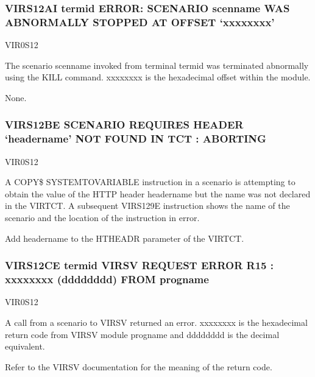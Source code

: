 \documentclass[letterpaper,10pt,english]{sphinxmanual}
\begin{document}
\subsubsection{VIRS12AI termid ERROR: SCENARIO scenname WAS ABNORMALLY STOPPED AT OFFSET ‘xxxxxxxx’}
\label{\detokenize{messages:virs12ai-termid-error-scenario-scenname-was-abnormally-stopped-at-offset-xxxxxxxx}}\begin{description}
\sphinxAtStartPar
VIR0S12

\sphinxAtStartPar
The scenario scenname invoked from terminal termid was terminated abnormally using the KILL command. xxxxxxxx is the hexadecimal offset within the module.

\sphinxAtStartPar
None.

\end{description}


\subsubsection{VIRS12BE SCENARIO REQUIRES HEADER ‘headername’ NOT FOUND IN TCT : ABORTING}
\label{\detokenize{messages:virs12be-scenario-requires-header-headername-not-found-in-tct-aborting}}\begin{description}
\sphinxAtStartPar
VIR0S12

\sphinxAtStartPar
A COPY\$ SYSTEM\sphinxhyphen{}TO\sphinxhyphen{}VARIABLE instruction in a scenario is attempting to obtain the value of the HTTP header headername but the name was not declared in the VIRTCT. A subsequent VIRS129E instruction shows the name of the scenario and the location of the instruction in error.

\sphinxAtStartPar
Add headername to the HTHEADR parameter of the VIRTCT.

\end{description}


\subsubsection{VIRS12CE termid VIRSV REQUEST ERROR \textendash{} R15 : xxxxxxxx (dddddddd) FROM progname}
\label{\detokenize{messages:virs12ce-termid-virsv-request-error-r15-xxxxxxxx-dddddddd-from-progname}}\begin{description}
\sphinxAtStartPar
VIR0S12

\sphinxAtStartPar
A call from a scenario to VIRSV returned an error. xxxxxxxx is the hexadecimal return code from VIRSV module progname and dddddddd is the decimal equivalent.

\sphinxAtStartPar
Refer to the VIRSV documentation for the meaning of the return code.

\end{description}
\end{document}

